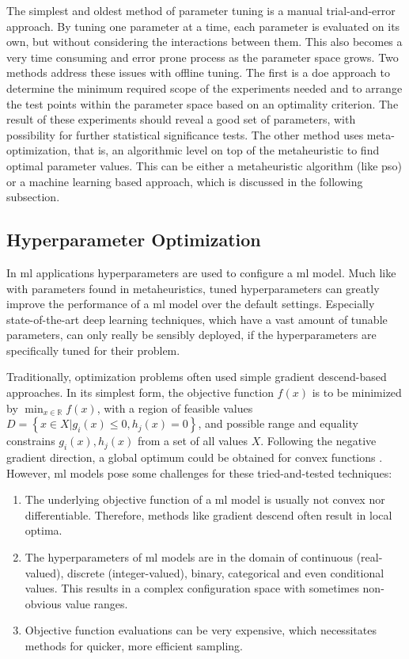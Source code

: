 The simplest and oldest method of parameter tuning is a manual trial-and-error approach. By tuning one parameter at a time, each parameter is evaluated on its own, but without considering the interactions between them. This also becomes a very time consuming and error prone process as the parameter space grows.
Two methods address these issues with offline tuning. The first is a \gls{doe} approach to determine the minimum required scope of the experiments needed and to arrange the test points within the parameter space based on an optimality criterion. The result of these experiments should reveal a good set of parameters, with possibility for further statistical significance tests.  
The other method uses meta-optimization, that is, an algorithmic level on top of the metaheuristic to find optimal parameter values. This can be either a metaheuristic algorithm (like \gls{pso}) or a machine learning based approach, which is discussed in the following subsection.


\subsection{Hyperparameter Optimization}
\label{chap:hyperopt}

In \gls{ml} applications hyperparameters are used to configure a \gls{ml} model. Much like with parameters found in metaheuristics, tuned hyperparameters can greatly improve the performance of a \gls{ml} model over the default settings. Especially state-of-the-art deep learning techniques, which have a vast amount of tunable parameters, can only really be sensibly deployed, if the hyperparameters are specifically tuned for their problem.

Traditionally, optimization problems often used simple gradient descend-based approaches. In its simplest form, the objective function $f(x)$ is to be minimized by $\min_{x \in \mathbb{R}} f(x)$, with a region of feasible values $D = \left\lbrace { x \in X | g_i(x) \leq 0, h_j(x) = 0}\right\rbrace $, and possible range and equality constrains $g_i(x), h_j(x)$ from a set of all values $X$. Following the negative gradient direction, a global optimum could be obtained for convex functions \cite{yang2020hyperparameter}. 
However, \gls{ml} models pose some challenges for these tried-and-tested techniques:
\begin{enumerate}
	\item The underlying objective function of a \gls{ml} model is usually not convex nor differentiable. Therefore, methods like gradient descend often result in local optima.
	\item The hyperparameters of \gls{ml} models are in the domain of continuous (real-valued),  discrete (integer-valued), binary, categorical and even conditional values. This results in a complex configuration space with sometimes non-obvious value ranges.
	\item Objective function evaluations can be very expensive, which necessitates methods for quicker, more efficient sampling. 
\end{enumerate}

